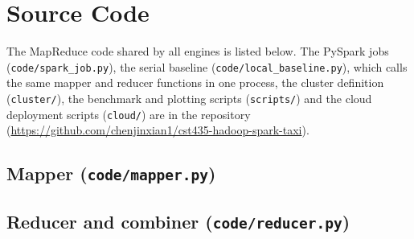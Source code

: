 \section{Source Code}\label{app:code}
The MapReduce code shared by all engines is listed below. The PySpark jobs
(\texttt{code/spark\_job.py}), the serial baseline (\texttt{code/local\_baseline.py}),
which calls the same mapper and reducer functions in one process, the cluster definition (\texttt{cluster/}), the
benchmark and plotting scripts (\texttt{scripts/}) and the cloud deployment scripts
(\texttt{cloud/}) are in the repository
(\url{https://github.com/chenjinxian1/cst435-hadoop-spark-taxi}).

\subsection{Mapper (\texttt{code/mapper.py})}


\subsection{Reducer and combiner (\texttt{code/reducer.py})}
